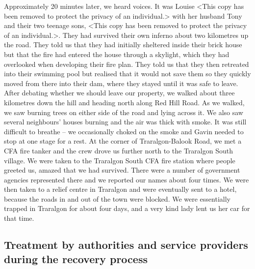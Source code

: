 \documentclass[a4paper]{article}
\begin{document}
        Approximately 20 minutes later, we heard voices. It was Louise <This copy has been removed to protect the privacy of an individual.> with her husband Tony and their two teenage sons, <This copy has been removed to protect the privacy of an individual.>. They had survived their own inferno about two kilometres up the road. They told us that they had initially sheltered inside their brick house but that the fire had entered the house through a skylight, which they had overlooked when developing their fire plan. They told us that they then retreated into their swimming pool but realised that it would not save them so they quickly moved from there into their dam, where they stayed until it was safe to leave. After debating whether we should leave our property, we walked about three kilometres down the hill and heading north along Red Hill Road. As we walked, we saw burning trees on either side of the road and lying across it. We also saw several neighbours' houses burning and the air was thick with smoke. It was still difficult to breathe – we occasionally choked on the smoke and Gavin needed to stop at one stage for a rest. At the corner of Traralgon-Balook Road, we met a CFA fire tanker and the crew drove us further north to the Traralgon South village.
        We were taken to the Traralgon South CFA fire station where people greeted us, amazed that we had survived. There were a number of government agencies represented there and we reported our names about four times. We were then taken to a relief centre in Traralgon and were eventually sent to a hotel, because the roads in and out of the town were blocked. We were essentially trapped in Traralgon for about four days, and a very kind lady lent us her car for that time.

    \subsection{Treatment by authorities and service providers during the recovery process}
\end{document}
